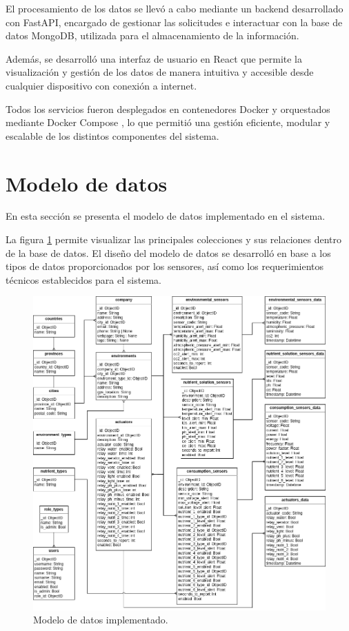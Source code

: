 El procesamiento de los datos se llevó a cabo mediante un backend desarrollado
con FastAPI, encargado de gestionar las solicitudes e interactuar con la base
de datos MongoDB, utilizada para el almacenamiento de la información.

Además, se desarrolló una interfaz de usuario en React que permite la
visualización y gestión de los datos de manera intuitiva y accesible desde
cualquier dispositivo con conexión a internet.

Todos los servicios fueron desplegados en contenedores Docker y orquestados
mediante Docker Compose \cite{DockerCompose}, lo que permitió una gestión
eficiente, modular y escalable de los distintos componentes del sistema.

\section{Modelo de datos}

En esta sección se presenta el modelo de datos implementado en el sistema.

La figura \ref{fig:modelo de datos} permite visualizar las principales
colecciones y sus relaciones dentro de la base de datos. El diseño del modelo
de datos se desarrolló en base a los tipos de datos proporcionados por los
sensores, así como los requerimientos técnicos establecidos para el sistema.

\begin{figure}[H]
    \centering
    \includegraphics[width=.99\textwidth]{./Images/15.png}
    \caption{Modelo de datos implementado.}
    \label{fig:modelo de datos}
\end{figure}

